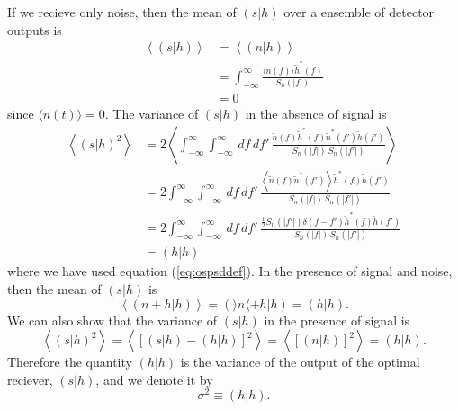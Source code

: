 If we recieve only noise, then the mean of $(s|h)$ over a ensemble of detector
outputs is 
\begin{equation}
\begin{split}
\left\langle (s|h) \right\rangle &= \left\langle (n|h) \right\rangle \\
&= \int_{-\infty}^{\infty} 
   \frac{\langle\tilde{n}(f)\rangle \tilde{h}^\ast(f)}{S_n(|f|)} \\
&= 0
\end{split}
\end{equation}
since $\langle n(t) \rangle = 0$. The variance of $(s|h)$ in the absence of
signal is
\begin{equation}
\begin{split}
\left\langle(s|h)^2\right\rangle 
&= 2 \left\langle \int_{-\infty}^\infty \int_{-\infty}^\infty \,df\,df'\,
\frac{\tilde{n}(f)\tilde{h}^\ast(f) \tilde{n}^\ast(f')\tilde{h}(f')}
{S_n(|f|)\,S_n(|f'|)} \right\rangle \\
&= 2 \int_{-\infty}^\infty \int_{-\infty}^\infty \,df\,df'\,
\frac{\left\langle \tilde{n}(f)\tilde{n}^\ast(f')\right\rangle\tilde{h}^\ast(f)\tilde{h}(f')}
{S_n(|f|)\,S_n(|f'|)} \\
&= 2 \int_{-\infty}^\infty \int_{-\infty}^\infty \,df\,df'\,
\frac{\frac{1}{2}S_n(|f'|)\delta(f-f') \tilde{h}^\ast(f)\tilde{h}(f')}
{S_n(|f|)\,S_n(|f'|)} \\
&= (h|h)
\end{split}
\label{eq:filtervariance}
\end{equation}
where we have used equation (\ref{eq:ospsddef}).  In the presence of signal
and noise, then the mean of $(s|h)$ is
\begin{equation}
\left\langle (n+h|h) \right\rangle = (\rangle n \langle + h|h) = (h|h).
\end{equation}
We can also show that the variance of $(s|h)$ in the presence of signal is
\begin{equation}
\left\langle (s|h)^2 \right\rangle 
= \left\langle \left[ (s|h) - (h|h) \right]^2 \right\rangle
= \left\langle \left[ (n|h) \right]^2 \right\rangle
= (h|h).
\end{equation}
Therefore the quantity $(h|h)$ is the variance of the output of the optimal
reciever, $(s|h)$, and we denote it by
\begin{equation}
\sigma^2 \equiv (h|h).
\label{eq:sigmasqdef}
\end{equation}

